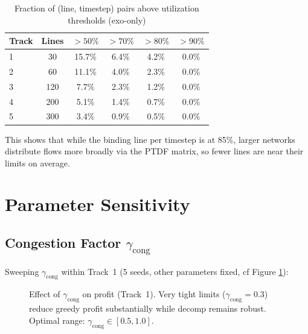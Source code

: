 \documentclass[11pt,a4paper]{article}
\begin{document}
\begin{table}[H]
\centering
\caption{Fraction of (line, timestep) pairs above utilization thresholds (exo-only)}
\label{tab:line-util}
\begin{tabular}{lccccc}
\toprule
\textbf{Track} & \textbf{Lines} & $>50\%$ & $>70\%$ & $>80\%$ & $>90\%$ \\
\midrule
1 & 30 & 15.7\% & 6.4\% & 4.2\% & 0.0\% \\
2 & 60 & 11.1\% & 4.0\% & 2.3\% & 0.0\% \\
3 & 120 & 7.7\% & 2.3\% & 1.2\% & 0.0\% \\
4 & 200 & 5.1\% & 1.4\% & 0.7\% & 0.0\% \\
5 & 300 & 3.4\% & 0.9\% & 0.5\% & 0.0\% \\
\bottomrule
\end{tabular}
\end{table}

This shows that while the binding line per timestep is at 85\%, larger networks distribute flows more broadly via the PTDF matrix, so fewer lines are near their limits on average.

\section{Parameter Sensitivity}

\subsection{Congestion Factor $\gamma_{\mathrm{cong}}$}

Sweeping $\gamma_{\mathrm{cong}}$ within Track~1 (5 seeds, other parameters fixed, cf Figure \ref{fig:gamma-sweep-t1}):

\begin{figure}[h]
\centering
{}
\caption{Effect of $\gamma_{\mathrm{cong}}$ on profit (Track~1). Very tight limits ($\gamma_{\mathrm{cong}} = 0.3$) reduce greedy profit substantially while decomp remains robust. Optimal range: $\gamma_{\mathrm{cong}} \in [0.5, 1.0]$.}
\label{fig:gamma-sweep-t1}
\end{figure}
\end{document}
